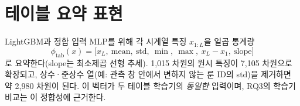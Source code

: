 
\section{테이블 요약 표현}
\label{sec:feat-tabular}

LightGBM과 정합 입력 MLP를 위해 각 시계열 특징 $x_{1:L}$을 일곱 통계량
\begin{equation}
  \phi_{\mathrm{tab}}(x) = \big[x_L,\ \mathrm{mean},\ \mathrm{std},\ \min,\ \max,\ x_L - x_1,\ \mathrm{slope}\big]
  \label{eq:phitab}
\end{equation}
로 요약한다(slope는 최소제곱 선형 추세). 1{,}015 차원의 원시 특징이 7{,}105 차원으로 확장되고, 상수·준상수 열(예: 관측 창 안에서 변하지 않는 룬 ID의 std)을 제거하면 약 2{,}980 차원이 된다. 이 벡터가 두 테이블 학습기의 \emph{동일한} 입력이며, RQ3의 학습기 비교는 이 정합성에 근거한다.
